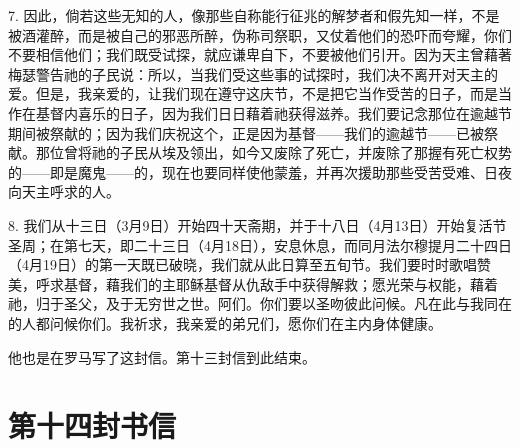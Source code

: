 7. 因此，倘若这些无知的人，像那些自称能行征兆的解梦者和假先知一样，不是被酒灌醉，而是被自己的邪恶所醉，伪称司祭职，又仗着他们的恐吓而夸耀，你们不要相信他们；我们既受试探，就应谦卑自下，不要被他们引开。因为天主曾藉著梅瑟警告祂的子民说：所以，当我们受这些事的试探时，我们决不离开对天主的爱。但是，我亲爱的，让我们现在遵守这庆节，不是把它当作受苦的日子，而是当作在基督内喜乐的日子，因为我们日日藉着祂获得滋养。我们要记念那位在逾越节期间被祭献的；因为我们庆祝这个，正是因为基督——我们的逾越节——已被祭献。那位曾将祂的子民从埃及领出，如今又废除了死亡，并废除了那握有死亡权势的——即是魔鬼——的，现在也要同样使他蒙羞，并再次援助那些受苦受难、日夜向天主呼求的人。\par

8. 我们从十三日（3月9日）开始四十天斋期，并于十八日（4月13日）开始复活节圣周；在第七天，即二十三日（4月18日），安息休息，而同月法尔穆提月二十四日（4月19日）的第一天既已破晓，我们就从此日算至五旬节。我们要时时歌唱赞美，呼求基督，藉我们的主耶稣基督从仇敌手中获得解救；愿光荣与权能，藉着祂，归于圣父，及于无穷世之世。阿们。你们要以圣吻彼此问候。凡在此与我同在的人都问候你们。我祈求，我亲爱的弟兄们，愿你们在主内身体健康。\par

他也是在罗马写了这封信。第十三封信到此结束。\par



\section{第十四封书信}

\par

